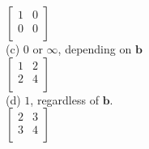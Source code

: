 \documentclass[10pt,twoside,reqno]{article}
\begin{document}
\begin{enumerate}
\vspace{3mm}
$
$$
\begin{bmatrix}
1&0\\
0&0\\
\end{bmatrix}
$$
$\\
\vspace{3mm}
(c) $0$ or $\infty$, depending on $\pmb{b}$\\
\vspace{3mm}
$
$$
\begin{bmatrix}
1&2\\
2&4\\
\end{bmatrix}
$$
$\\
\vspace{6mm}
(d) $1$, regardless of $\pmb{b}$.\\
\vspace{3mm}
$
$$
\begin{bmatrix}
2&3\\
3&4\\
\end{bmatrix}
$$
$\\
\vspace{3mm}



\end{enumerate}
\end{document}

